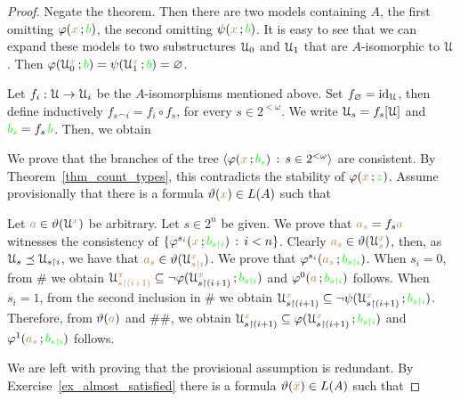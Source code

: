 \begin{proof}
  Negate the theorem.
  Then there are two models containing $A$, the first omitting $\varphi({\color{brown} x}\,;{\color{green} b})$, the second omitting $\psi({\color{brown} x}\,;{\color{green} b})$.
  It is easy to see that we can expand these models to two substructures $\EuScript U_0$ and $\EuScript U_1$ that are $A$-isomorphic to $\EuScript U$.
  Then $\varphi(\EuScript U_0^{{\color{brown} x}}\,;{\color{green} b})=\psi(\EuScript U_1^{{\color{brown} x}}\,;{\color{green} b})=\varnothing$.

  Let $f_i:\EuScript U\to\EuScript U_i$ be the $A$-isomorphisms mentioned above. 
  Set $f_\varnothing={\rm id}_\EuScript U$, then define inductively $f_{s\frown i}=f_i\circ f_s$, for every $s\in 2^{<\omega}$.
  We write $\EuScript U_s=f_s[\EuScript U]$ and ${\color{green} b_s}=f_s\,{\color{green} b}$.
  Then, we obtain

  
  We prove that the branches of the tree $\langle\varphi({\color{brown} x}\,;{\color{green} b_s})\, :\,  s\in2^{<\omega}\rangle$ are consistent. 
  By Theorem~\ref{thm_count_types}, this contradicts the stability of $\varphi({\color{brown} x}\,;{\color{green} z})$.
  Assume provisionally that there is a formula $\vartheta({\color{brown} x})\in L(A)$ such that
  
  
  Let ${\color{brown} a}\in\vartheta(\EuScript U^{\color{brown} x})$ be arbitrary.
  Let $s\in2^n$ be given.
  We prove that ${\color{brown} a_s}=f_s{\color{brown} a}$ witnesses the consistency of $\{\varphi^{s_i}({\color{brown} x}\,;{\color{green} b_{s\restriction i}})\, :\,i<n\}$.
  Clearly ${\color{brown} a_s}\in\vartheta(\EuScript U_s^{\color{brown} x})$, then, as $\EuScript U_s\preceq\EuScript U_{s\restriction i}$, we have that ${\color{brown} a_s}\in\vartheta(\EuScript U_{s\restriction i}^{\color{brown} x})$.
  We prove that $\varphi^{s_i}({\color{brown} a_s}\,;{\color{green} b_{s\restriction i}})$.
  When $s_i=0$, from \# we obtain $\EuScript U_{s\restriction(i+1)}^{\color{brown} x}\subseteq\neg\varphi(\EuScript U_{s\restriction(i+1)}^{{\color{brown} x}}\,;{\color{green} b_{s\restriction i}})$ and $\varphi^0({\color{brown} a}\,;{\color{green} b_{s\restriction i}})$ follows.
  When $s_i=1$, from the second inclusion in \# we obtain $\EuScript U_{s\restriction(i+1)}^{{\color{brown} x}}\subseteq\neg\psi(\EuScript U_{s\restriction(i+1)}^{{\color{brown} x}}\,;{\color{green} b_{s\restriction i}})$.
  Therefore, from $\vartheta({\color{brown} a})$ and \#\#, we obtain  $\EuScript U_{s\restriction(i+1)}^{{\color{brown} x}}\subseteq\varphi(\EuScript U_{s\restriction(i+1)}^{{\color{brown} x}}\,;{\color{green} b_{s\restriction i}})$ and $\varphi^1({\color{brown} a_s}\,;{\color{green} b_{s\restriction i}})$ follows.

  We are left with proving that the provisional assumption is redundant.
  By Exercise~\ref{ex_almost_satisfied} there is a formula $\vartheta({\color{brown}\bar x})\in L(A)$ such that


\end{proof}
